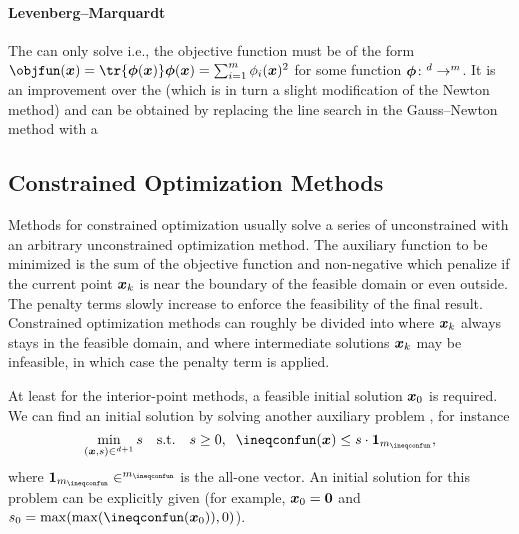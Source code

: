 \paragraph{Levenberg--Marquardt}

The 
can only solve  i.e.,
the objective function must be of the form
$\objfun(\*x) = \tr{\*\phi(\*x)} \*\phi(\*x) = \sum_{i=1}^m \phi_i(\*x)^2$
for some function $\*\phi\colon \real^d \to \real^m$.
It is an improvement over the 
(which is in turn a slight modification of the Newton method)
and can be obtained by replacing the line search in the
Gauss--Newton method with a 



\subsection{Constrained Optimization Methods}
\label{sec:513gradientBasedConstrained}

Methods for constrained optimization usually
solve a series of unconstrained  with an arbitrary
unconstrained optimization method.
The auxiliary function to be minimized is
the sum of the objective function and non-negative 
which penalize if the current point ${\boldsymbol{x}}_k$ is near the boundary
of the feasible domain or even outside.
The penalty terms slowly increase to enforce
the feasibility of the final result.
Constrained optimization methods can roughly be divided
into 
where ${\boldsymbol{x}}_k$ always stays in the feasible domain,
and 
where intermediate solutions ${\boldsymbol{x}}_k$ may be infeasible,
in which case the penalty term is applied.

At least for the interior-point methods,
a feasible initial solution ${\boldsymbol{x}}_0$ is required.
We can find an initial solution by solving another auxiliary problem
\cite{Toussaint15Introduction}, for instance
\begin{equation}
  \min_{(\*x, s) \in \real^{d+1}} s
  \quad\text{s.t.}\quad
  s \ge 0,\;\;
  \ineqconfun(\*x) \le s \cdot \*1_{m_{\ineqconfun}},
\end{equation}
where $\*1_{m_{\ineqconfun}} \in \real^{m_{\ineqconfun}}$
is the all-one vector.
An initial solution for this problem can be explicitly given
(for example, ${\boldsymbol{x}}_0 = {\boldsymbol{0}}$ and
$s_0 = \max(\max(\ineqconfun(\*x_0)), 0)$).

